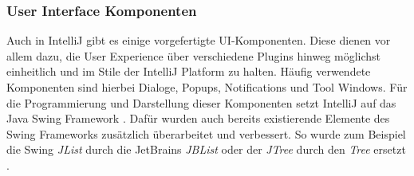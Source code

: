 \subsubsection{User Interface Komponenten}
  Auch in IntelliJ gibt es einige vorgefertigte UI-Komponenten. Diese dienen vor allem dazu, die
  User Experience über verschiedene Plugins hinweg möglichst einheitlich und im Stile
  der IntelliJ Platform zu halten. Häufig verwendete Komponenten sind hierbei Dialoge, Popups,
  Notifications und Tool Windows. Für die Programmierung und Darstellung dieser Komponenten
  setzt IntelliJ auf das Java Swing Framework 
  \cite{IntelliJPlatformSDKUserInterfaceComponents}. 
  Dafür wurden auch bereits existierende Elemente des Swing Frameworks zusätzlich überarbeitet 
  und verbessert. So wurde zum Beispiel die Swing \emph{JList} durch die JetBrains \emph{JBList} 
  oder der \emph{JTree} durch den \emph{Tree} ersetzt 
  \cite{IntelliJPlatformSDKListAndTreeControls,IntelliJPlatformSDKMiscellaneousSwingComponents}.
